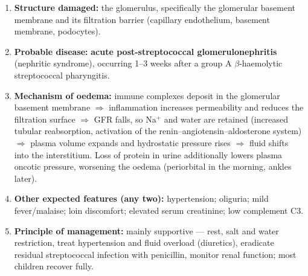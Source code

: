 \documentclass[11pt]{article}
\newcommand{\cle}[1]{{\popxbold\color{popdark}#1}}
\begin{document}
\begin{corrige}
\begin{enumerate}
\item \textbf{Structure damaged:} the \cle{glomerulus}, specifically the glomerular basement membrane and its filtration barrier (capillary endothelium, basement membrane, podocytes).
\item \textbf{Probable disease:} \textbf{acute post-streptococcal glomerulonephritis} (nephritic syndrome), occurring 1--3 weeks after a group A $\beta$-haemolytic streptococcal pharyngitis.
\item \textbf{Mechanism of oedema:} immune complexes deposit in the glomerular basement membrane $\Rightarrow$ inflammation increases permeability and reduces the filtration surface $\Rightarrow$ GFR falls, so Na$^+$ and water are retained (increased tubular reabsorption, activation of the renin–angiotensin–aldosterone system) $\Rightarrow$ plasma volume expands and hydrostatic pressure rises $\Rightarrow$ fluid shifts into the interstitium. Loss of protein in urine additionally lowers plasma oncotic pressure, worsening the oedema (periorbital in the morning, ankles later).
\item \textbf{Other expected features (any two):} hypertension; oliguria; mild fever/malaise; loin discomfort; elevated serum creatinine; low complement C3.
\item \textbf{Principle of management:} mainly supportive — rest, salt and water restriction, treat hypertension and fluid overload (diuretics), eradicate residual streptococcal infection with penicillin, monitor renal function; most children recover fully.
\end{enumerate}
\end{corrige}
\end{document}
